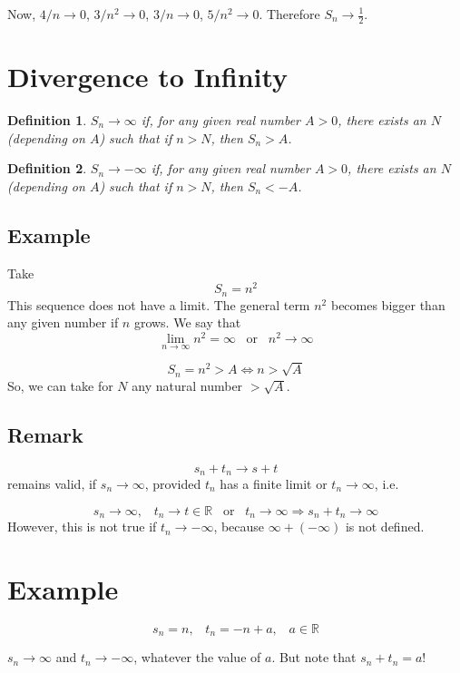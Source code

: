 \documentclass[12pt]{scrbook}
\newtheorem*{definition}{Definition}
\begin{document}
Now, $4/n \rightarrow 0$, $3/n^2 \rightarrow 0$, $3/n \rightarrow 0$, $5/n^2 \rightarrow 0$.  
Therefore $S_n \rightarrow \frac{1}{2}$.

\section{Divergence to Infinity}

\begin{definition}
$S_n \rightarrow \infty$ if, for any given real number $A > 0$, there exists an $N$ (depending on $A$) such that 
if $n > N$, then $S_n > A$.
\end{definition}

\begin{definition}
$S_n \rightarrow -\infty$ if, for any given real number $A > 0$, there exists an $N$ (depending on $A$) such that 
if $n > N$, then $S_n < -A$.
\end{definition}

\subsection{Example}
Take 
\[ S_n = n^2 \]
This sequence does not have a limit.  The general term $n^2$ becomes bigger than any given number if $n$ grows.
We say that 
\[ \lim_{n \to \infty} n^2 = \infty \;\;\; \text{or} \;\;\; n^2 \rightarrow \infty \]

\[ S_n = n^2 > A \Leftrightarrow n > \sqrt{A} \]
So, we can take for $N$ any natural number $> \sqrt{A}$.

\subsection{Remark}
\[ s_n + t_n \rightarrow s + t \]
remains valid, if $s_n \rightarrow \infty$, provided $t_n$ has a finite limit or $t_n \rightarrow \infty$, i.e.

\[ s_n \rightarrow \infty, \;\;\; t_n \rightarrow t \in \mathbb{R} \;\;\; \text{or} \;\;\; t_n \rightarrow \infty
\Rightarrow s_n + t_n \rightarrow \infty \]
However, this is not true if $t_n \rightarrow -\infty$, because $\infty + (-\infty)$ is not defined.

\section{Example}
\[ s_n = n, \;\;\; t_n = -n + a, \;\;\; a \in \mathbb{R} \]

$s_n \rightarrow \infty$ and $t_n \rightarrow -\infty$, whatever the value of $a$.  But note that $s_n + t_n = a$!
\end{document}
